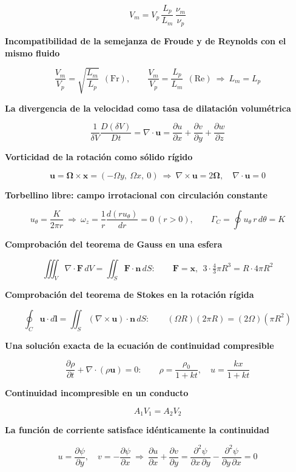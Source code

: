 \documentclass[10pt,openany]{book}
\begin{document}
\[
V_m = V_p\,\frac{L_p}{L_m}\,\frac{\nu_m}{\nu_p}
\]

\noindent\textbf{Incompatibilidad de la semejanza de Froude y de Reynolds con el mismo fluido}

\[
\frac{V_m}{V_p} = \sqrt{\frac{L_m}{L_p}}\ \ (\mathrm{Fr}),\qquad \frac{V_m}{V_p} = \frac{L_p}{L_m}\ \ (\mathrm{Re}) \ \Rightarrow\ L_m = L_p
\]

\noindent\textbf{La divergencia de la velocidad como tasa de dilatación volumétrica}

\[
\frac{1}{\delta V}\frac{D(\delta V)}{Dt} = \nabla\cdot\mathbf{u} = \frac{\partial u}{\partial x} + \frac{\partial v}{\partial y} + \frac{\partial w}{\partial z}
\]

\noindent\textbf{Vorticidad de la rotación como sólido rígido}

\[
\mathbf{u} = \boldsymbol{\Omega}\times\mathbf{x} = (-\Omega y,\ \Omega x,\ 0)\ \Rightarrow\ \nabla\times\mathbf{u} = 2\boldsymbol{\Omega},\quad \nabla\cdot\mathbf{u} = 0
\]

\noindent\textbf{Torbellino libre: campo irrotacional con circulación constante}

\[
u_\theta = \frac{K}{2\pi r}\ \Rightarrow\ \omega_z = \frac{1}{r}\frac{d(r u_\theta)}{dr} = 0\ (r > 0),\qquad \Gamma_C = \oint u_\theta\,r\,d\theta = K
\]

\noindent\textbf{Comprobación del teorema de Gauss en una esfera}

\[
\iiint_V \nabla\cdot\mathbf{F}\,dV = \iint_S \mathbf{F}\cdot\mathbf{n}\,dS:\qquad \mathbf{F} = \mathbf{x},\ \ 3\cdot\tfrac43\pi R^{3} = R\cdot 4\pi R^{2}
\]

\noindent\textbf{Comprobación del teorema de Stokes en la rotación rígida}

\[
\oint_C \mathbf{u}\cdot d\mathbf{l} = \iint_S (\nabla\times\mathbf{u})\cdot\mathbf{n}\,dS:\qquad (\Omega R)(2\pi R) = (2\Omega)(\pi R^{2})
\]

\noindent\textbf{Una solución exacta de la ecuación de continuidad compresible}

\[
\frac{\partial\rho}{\partial t} + \nabla\cdot(\rho\mathbf{u}) = 0:\qquad \rho = \frac{\rho_0}{1 + kt},\quad u = \frac{k x}{1 + kt}
\]

\noindent\textbf{Continuidad incompresible en un conducto}

\[
A_1 V_1 = A_2 V_2
\]

\noindent\textbf{La función de corriente satisface idénticamente la continuidad}

\[
u = \frac{\partial\psi}{\partial y},\quad v = -\frac{\partial\psi}{\partial x}\ \Rightarrow\ \frac{\partial u}{\partial x} + \frac{\partial v}{\partial y} = \frac{\partial^{2}\psi}{\partial x\,\partial y} - \frac{\partial^{2}\psi}{\partial y\,\partial x} = 0
\]
\end{document}
